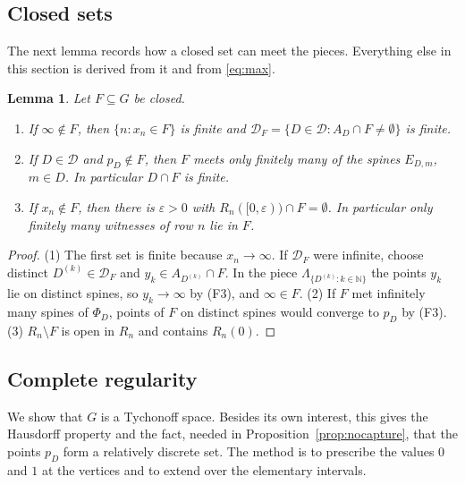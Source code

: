\documentclass[11pt]{amsart}
\newtheorem{lemma}[theorem]{Lemma}
\theoremstyle{definition}
\theoremstyle{remark}
\newcommand{\N}{\mathbb{N}}
\newcommand{\cD}{\mathcal{D}}
\numberwithin{equation}{section}
\begin{document}
\subsection{Closed sets}
The next lemma records how a closed set can meet the pieces. Everything else in this section is derived from it and from \eqref{eq:max}.
\begin{lemma}\label{lem:closed}
Let $F\subseteq G$ be closed.
\begin{enumerate}[label=\textup{(\arabic*)}]
\item If $\infty\notin F$, then $\{n:x_n\in F\}$ is finite and $\cD_F=\{D\in\cD:A_D\cap F\ne\emptyset\}$ is finite.
\item If $D\in\cD$ and $p_D\notin F$, then $F$ meets only finitely many of the spines $E_{D,m}$, $m\in D$. In particular $D\cap F$ is finite.
\item If $x_n\notin F$, then there is $\varepsilon>0$ with $R_n([0,\varepsilon))\cap F=\emptyset$. In particular only finitely many witnesses of row $n$ lie in $F$.
\end{enumerate}
\end{lemma}
\begin{proof}
(1) The first set is finite because $x_n\to\infty$. If $\cD_F$ were infinite, choose distinct $D^{(k)}\in\cD_F$ and $y_k\in A_{D^{(k)}}\cap F$. In the piece $\Lambda_{\{D^{(k)}:k\in\N\}}$ the points $y_k$ lie on distinct spines, so $y_k\to\infty$ by (F3), and $\infty\in F$.
(2) If $F$ met infinitely many spines of $\Phi_D$, points of $F$ on distinct spines would converge to $p_D$ by (F3).
(3) $R_n\setminus F$ is open in $R_n$ and contains $R_n(0)$.
\end{proof}

\subsection{Complete regularity}
We show that $G$ is a Tychonoff space. Besides its own interest, this gives the Hausdorff property and the fact, needed in Proposition~\ref{prop:nocapture}, that the points $p_D$ form a relatively discrete set. The method is to prescribe the values $0$ and $1$ at the vertices and to extend over the elementary intervals.
\end{document}
